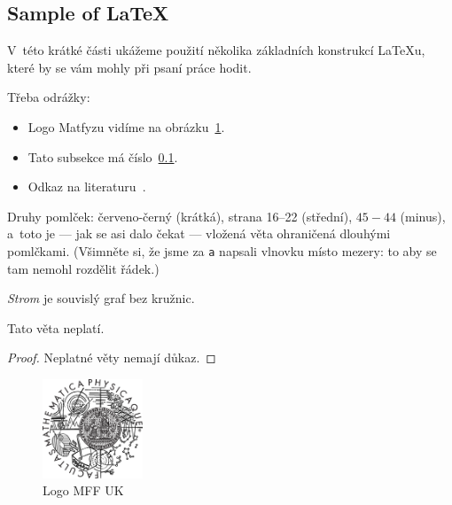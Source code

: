 
\subsection{Sample of \LaTeX} 
\label{ssec:ukazka} 

V~této krátké části ukážeme použití několika základních konstrukcí \LaTeX{}u,
které by se vám mohly při psaní práce hodit. 

Třeba odrážky:

\begin{itemize} 
\item Logo Matfyzu vidíme na obrázku~\ref{fig:mff}. 
\item Tato subsekce má číslo~\ref{ssec:ukazka}. 
\item Odkaz na literaturu~\cite{engelking89}. 
\end{itemize} 

Druhy pomlček:
červeno-černý (krátká), 
strana 16--22 (střední), 
$45-44$ (minus), 
a~toto je --- jak se asi dalo čekat --- vložená věta ohraničená dlouhými pomlčkami.
(Všimněte si, že jsme za \verb|a| napsali vlnovku místo mezery: to aby se
tam nemohl rozdělit řádek.)

  
\begin{define} 
{\sl Strom} je souvislý graf bez kružnic. 
\end{define} 

\begin{theorem} 
Tato věta neplatí.
\end{theorem} 

\begin{proof} 
Neplatné věty nemají důkaz.
\end{proof} 

\begin{figure} 
	\centering 
	\includegraphics[width=30mm]{logo.eps} 
	\caption{Logo MFF UK} 
	\label{fig:mff} 
\end{figure} 
